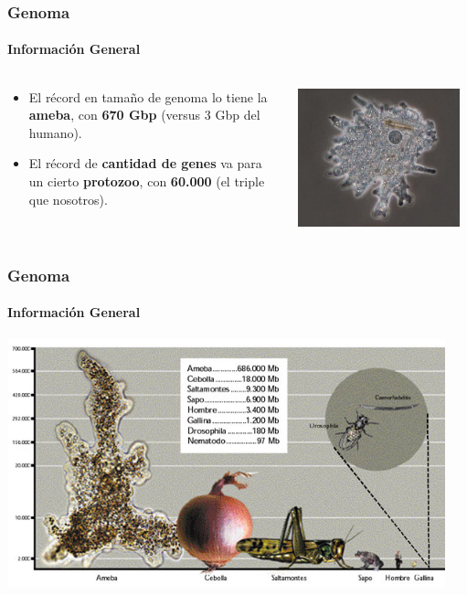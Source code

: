 \begin{frame}
\frametitle{Genoma}
\framesubtitle{Información General}
\begin{columns}
\begin{column}{0.7\textwidth}
	\begin{itemize}
	    \item El récord en tamaño de genoma lo tiene la \textbf{ameba}, con
	    \textbf{670 Gbp} (versus 3 Gbp del
	humano).
	    \item El récord de \textbf{cantidad de genes} va para un cierto
	    \textbf{protozoo}, con \textbf{60.000} (el
		triple que nosotros).
	\end{itemize}
\end{column}
\begin{column}{0.3\textwidth}
\begin{center}
	\includegraphics[width=0.95\textwidth]{img/ameba.jpg}
\end{center}
\end{column}
\end{columns}
\end{frame}

\begin{frame}
\frametitle{Genoma}
\framesubtitle{Información General}
\begin{center}
	\includegraphics[width=0.95\textwidth]{img/tamanos.jpg}
\end{center}
\end{frame}

